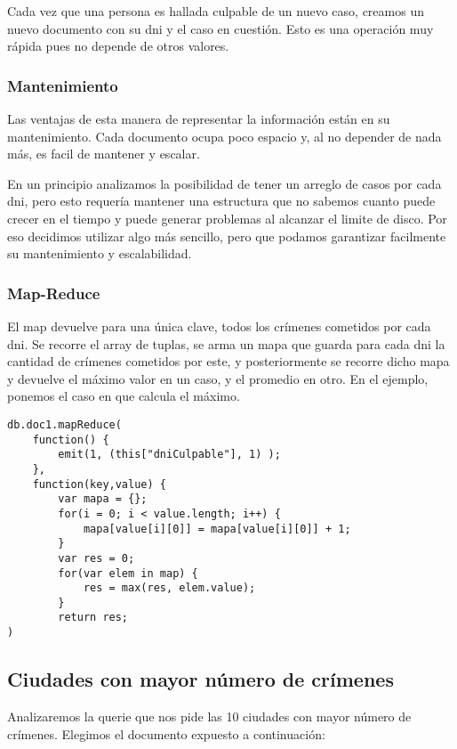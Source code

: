 \documentclass[11pt, a4paper]{article}
\begin{document}
Cada vez que una persona es hallada culpable de un nuevo caso, creamos un nuevo documento con su dni y el caso en cuesti\'on. Esto es una operaci\'on muy r\'apida pues no depende de otros valores.

\subsubsection{Mantenimiento}

Las ventajas de esta manera de representar la informaci\'on est\'an en su mantenimiento. Cada documento ocupa poco espacio y, al no depender de nada m\'as, es facil de mantener y escalar. \

En un principio analizamos la posibilidad de tener un arreglo de casos por cada dni, pero esto requer\'ia mantener una estructura que no sabemos cuanto puede crecer en el tiempo y puede generar problemas al alcanzar el limite de disco. Por eso decidimos utilizar algo m\'as sencillo, pero que podamos garantizar facilmente su mantenimiento y escalabilidad.

\subsubsection{Map-Reduce}

El map devuelve para una única clave, todos los crímenes cometidos por cada dni. Se recorre el array de tuplas, se arma un mapa que guarda para cada dni la cantidad de crímenes cometidos por este, y posteriormente se recorre dicho mapa y devuelve el máximo valor en un caso, y el promedio en otro. En el ejemplo, ponemos el caso en que calcula el máximo.

\begin{lstlisting}
db.doc1.mapReduce(
    function() {
        emit(1, (this["dniCulpable"], 1) );
    },
    function(key,value) { 
        var mapa = {};
        for(i = 0; i < value.length; i++) {
            mapa[value[i][0]] = mapa[value[i][0]] + 1;
        }
        var res = 0;
        for(var elem in map) {
        	res = max(res, elem.value);
        }
        return res;
)
\end{lstlisting}

\subsection{Ciudades con mayor n\'umero de cr\'imenes}

Analizaremos la querie que nos pide las 10 ciudades con mayor n\'umero de crímenes. Elegimos el documento expuesto a continuación:\
\end{document}
